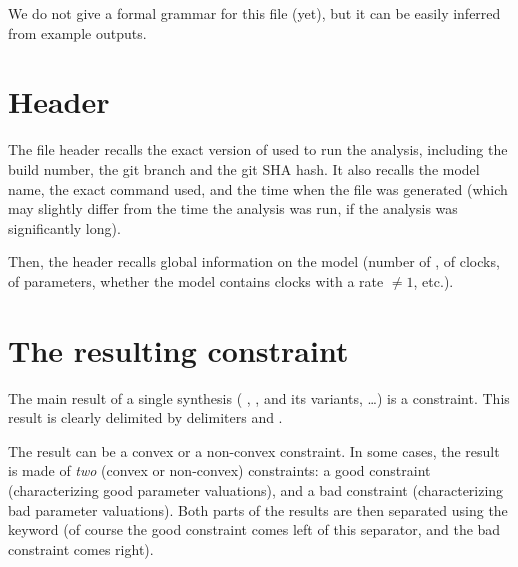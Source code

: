 We do not give a formal grammar for this file (yet), but it can be easily inferred from example outputs.


\section{Header}

The file header recalls the exact version of \imitator{} used to run the analysis, including the build number, the git branch and the git SHA hash.
It also recalls the model name, the exact command used, and the time when the file was generated (which may slightly differ from the time the analysis was run, if the analysis was significantly long).

Then, the header recalls global information on the model (number of \IPTA{}, of clocks, of parameters, whether the model contains clocks with a rate $\neq 1$, etc.).


\section{The resulting constraint}

The main result of a single synthesis (\ie{} \EFsynth{}, \PDFC{}, \IM{} and its variants, \PRP{}…) is a constraint.
This result is clearly delimited by delimiters  and .

The result can be a convex or a non-convex constraint.
In some cases, the result is made of \emph{two} (convex or non-convex) constraints: a good constraint (characterizing good parameter valuations), and a bad constraint (characterizing bad parameter valuations).
Both parts of the results are then separated using the keyword  (of course the good constraint comes left of this separator, and the bad constraint comes right).

